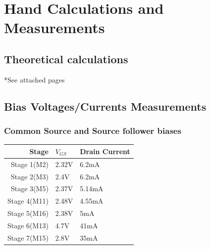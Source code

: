 \documentclass[11pt, twoside, letterpaper]{article}
\begin{document}
\section{Hand Calculations and Measurements}

\subsection{Theoretical calculations}
*See attached pages



\subsection{Bias Voltages/Currents Measurements}
\subsubsection{Common Source and Source follower biases}
\begin{tabular}{|r|l|l|}
\hline
Stage & $V_{GS}$ & Drain Current\\
\hline
Stage 1(M2) &2.32V&6.2mA\\
Stage 2(M3) &2.4V&6.2mA\\
Stage 3(M5) &2.37V&5.14mA\\
Stage 4(M11) &2.48V&4.55mA\\
Stage 5(M16) &2.38V&5mA\\%
Stage 6(M13) &4.7V&41mA\\
Stage 7(M15) &2.8V&35mA\\
\hline
\end{tabular}
\FloatBarrier
\end{document}
